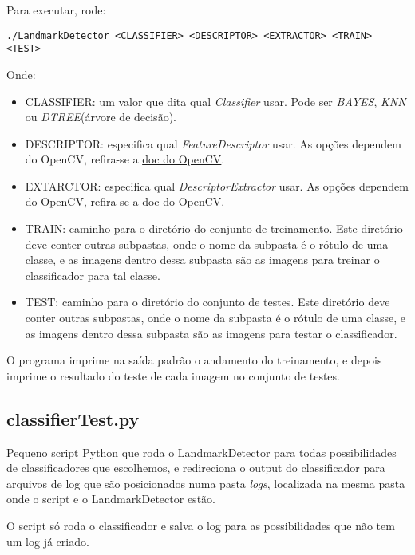 Para executar, rode:
\begin{small}
\begin{verbatim}
./LandmarkDetector <CLASSIFIER> <DESCRIPTOR> <EXTRACTOR> <TRAIN> <TEST>
\end{verbatim}
\end{small}
Onde:
\begin{itemize}
  \item CLASSIFIER: um valor que dita qual \textit{Classifier} usar. Pode ser \textit{BAYES}, \textit{KNN}
        ou \textit{DTREE}(árvore de decisão).
  \item DESCRIPTOR: especifica qual \textit{FeatureDescriptor} usar. As opções dependem do OpenCV, refira-se
        a \hyperref{http://docs.opencv.org/modules/features2d/doc/common_interfaces_of_feature_detectors.html}{}{featuredetector-create}{doc do OpenCV}.
  \item EXTARCTOR: especifica qual \textit{DescriptorExtractor} usar. As opções dependem do OpenCV, refira-se
        a \hyperref{http://docs.opencv.org/modules/features2d/doc/common_interfaces_of_descriptor_extractors.html}{}{descriptorextractor-create}{doc do OpenCV}.
  \item TRAIN: caminho para o diretório do conjunto de treinamento. Este diretório deve conter outras subpastas, 
        onde o nome da subpasta é o rótulo de uma classe, e as imagens dentro dessa subpasta são as imagens para
        treinar o classificador para tal classe.
  \item TEST: caminho para o diretório do conjunto de testes. Este diretório deve conter outras subpastas, 
        onde o nome da subpasta é o rótulo de uma classe, e as imagens dentro dessa subpasta são as imagens para
        testar o classificador.
\end{itemize}

O programa imprime na saída padrão o andamento do treinamento, e depois imprime o resultado do teste
de cada imagem no conjunto de testes.

\subsection{classifierTest.py}
Pequeno script Python que roda o LandmarkDetector para todas possibilidades de classificadores que 
escolhemos, e redireciona o output do classificador para arquivos de log que são posicionados numa
pasta \textit{logs}, localizada na mesma pasta onde o script e o LandmarkDetector estão.

O script só roda o classificador e salva o log para as possibilidades que não tem um log já criado.


